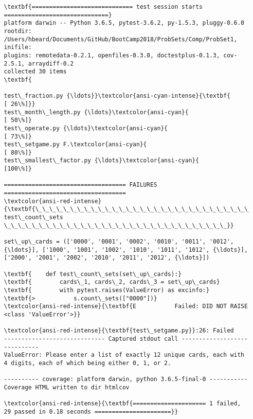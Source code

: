 \documentclass[11pt]{article}
\begin{document}
    \begin{Verbatim}[commandchars=\\\{\}]
\textbf{============================= test session starts ==============================}
platform darwin -- Python 3.6.5, pytest-3.6.2, py-1.5.3, pluggy-0.6.0
rootdir: /Users/hbeard/Documents/GitHub/BootCamp2018/ProbSets/Comp/ProbSet1, inifile:
plugins: remotedata-0.2.1, openfiles-0.3.0, doctestplus-0.1.3, cov-2.5.1, arraydiff-0.2
collected 30 items                                                             \textbf{

test\_fraction.py {\ldots}}\textcolor{ansi-cyan-intense}{\textbf{                                                [ 26\%]}}
test\_month\_length.py {\ldots}\textcolor{ansi-cyan}{                                             [ 50\%]}
test\_operate.py {\ldots}\textcolor{ansi-cyan}{                                                  [ 73\%]}
test\_setgame.py F.\textcolor{ansi-cyan}{                                                       [ 80\%]}
test\_smallest\_factor.py {\ldots}\textcolor{ansi-cyan}{                                           [100\%]}

=================================== FAILURES ===================================
\textcolor{ansi-red-intense}{\textbf{\_\_\_\_\_\_\_\_\_\_\_\_\_\_\_\_\_\_\_\_\_\_\_\_\_\_\_\_\_\_\_ test\_count\_sets \_\_\_\_\_\_\_\_\_\_\_\_\_\_\_\_\_\_\_\_\_\_\_\_\_\_\_\_\_\_\_\_}}

set\_up\_cards = (['0000', '0001', '0002', '0010', '0011', '0012', {\ldots}], ['1000', '1001', '1002', '1010', '1011', '1012', {\ldots}], ['2000', '2001', '2002', '2010', '2011', '2012', {\ldots}])

\textbf{    def test\_count\_sets(set\_up\_cards):}
\textbf{        cards\_1, cards\_2, cards\_3 = set\_up\_cards}
\textbf{        with pytest.raises(ValueError) as excinfo:}
\textbf{>           s.count\_sets(["0000"])}
\textcolor{ansi-red-intense}{\textbf{E           Failed: DID NOT RAISE <class 'ValueError'>}}

\textcolor{ansi-red-intense}{\textbf{test\_setgame.py}}:26: Failed
----------------------------- Captured stdout call -----------------------------
ValueError: Please enter a list of exactly 12 unique cards, each with 4 digits, each of which being either 0, 1, or 2.

---------- coverage: platform darwin, python 3.6.5-final-0 -----------
Coverage HTML written to dir htmlcov

\textcolor{ansi-red-intense}{\textbf{===================== 1 failed, 29 passed in 0.18 seconds ======================}}

    \end{Verbatim}
\end{document}
